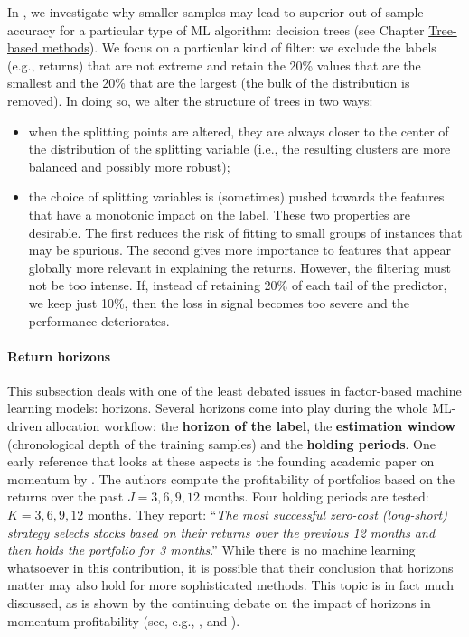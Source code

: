 In \cite{coqueret2019training}, we investigate why smaller samples may lead to superior out-of-sample accuracy for a particular type of ML algorithm: decision trees (see Chapter \href{/chap-07-trees}{Tree-based methods}). We focus on a particular kind of filter: we exclude the labels (e.g., returns) that are not extreme and retain the 20\% values that are the smallest and the 20\% that are the largest (the bulk of the distribution is removed). In doing so, we alter the structure of trees in two ways:

\begin{itemize}
\item when the splitting points are altered, they are always closer to the center of the distribution of the splitting variable (i.e., the resulting clusters are more balanced and possibly more robust);
\item the choice of splitting variables is (sometimes) pushed towards the features that have a monotonic impact on the label.\newline
These two properties are desirable. The first reduces the risk of fitting to small groups of instances that may be spurious. The second gives more importance to features that appear globally more relevant in explaining the returns. However, the filtering must not be too intense. If, instead of retaining 20\% of each tail of the predictor, we keep just 10\%, then the loss in signal becomes too severe and the performance deteriorates.
\end{itemize}

\paragraph{Return horizons}\label{horizons}

This subsection deals with one of the least debated issues in factor-based machine learning models: horizons. Several horizons come into play during the whole ML-driven allocation workflow: the \textbf{horizon of the label}, the \textbf{estimation window} (chronological depth of the training samples) and the \textbf{holding periods}. One early reference that looks at these aspects is the founding academic paper on momentum by \cite{jegadeesh1993returns}. The authors compute the profitability of portfolios based on the returns over the past $J=3, 6, 9, 12$ months. Four holding periods are tested: $K=3,6,9,12$ months. They report: ``\textit{The most successful zero-cost (long-short) strategy selects stocks based on their returns over the previous 12 months and then holds the portfolio for 3 months}.'' While there is no machine learning whatsoever in this contribution, it is possible that their conclusion that horizons matter may also hold for more sophisticated methods. This topic is in fact much discussed, as is shown by the continuing debate on the impact of horizons in momentum profitability (see, e.g., \cite{novy2012momentum}, \cite{gong2015momentum} and \cite{goyal2015momentum}).

